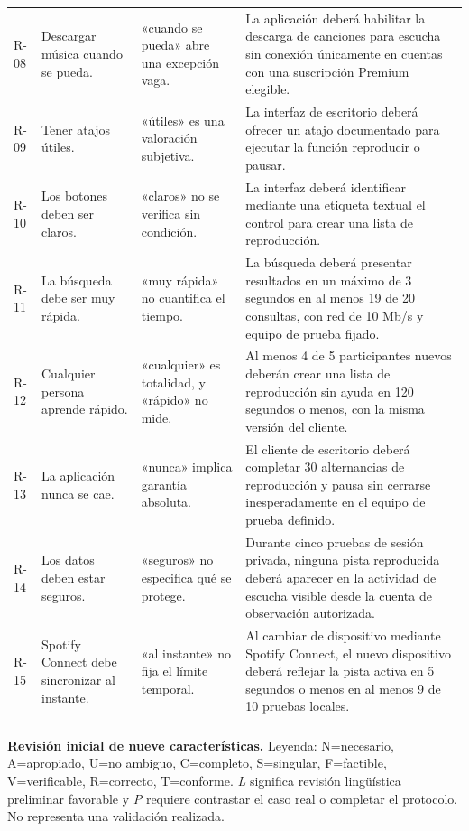 \begin{longtable}{@{}p{.06\linewidth}p{.185\linewidth}p{.19\linewidth}p{.51\linewidth}@{}}
R-08 & Descargar música cuando se pueda. & «cuando se pueda» abre una excepción vaga. & La aplicación deberá habilitar la descarga de canciones para escucha sin conexión únicamente en cuentas con una suscripción Premium elegible.\\\addlinespace[0pt]
R-09 & Tener atajos útiles. & «útiles» es una valoración subjetiva. & La interfaz de escritorio deberá ofrecer un atajo documentado para ejecutar la función reproducir o pausar.\\\addlinespace[0pt]
R-10 & Los botones deben ser claros. & «claros» no se verifica sin condición. & La interfaz deberá identificar mediante una etiqueta textual el control para crear una lista de reproducción.\\\addlinespace[0pt]
R-11 & La búsqueda debe ser muy rápida. & «muy rápida» no cuantifica el tiempo. & La búsqueda deberá presentar resultados en un máximo de 3 segundos en al menos 19 de 20 consultas, con red de 10 Mb/s y equipo de prueba fijado.\\\addlinespace[0pt]
R-12 & Cualquier persona aprende rápido. & «cualquier» es totalidad, y «rápido» no mide. & Al menos 4 de 5 participantes nuevos deberán crear una lista de reproducción sin ayuda en 120 segundos o menos, con la misma versión del cliente.\\\addlinespace[0pt]
R-13 & La aplicación nunca se cae. & «nunca» implica garantía absoluta. & El cliente de escritorio deberá completar 30 alternancias de reproducción y pausa sin cerrarse inesperadamente en el equipo de prueba definido.\\\addlinespace[0pt]
R-14 & Los datos deben estar seguros. & «seguros» no especifica qué se protege. & Durante cinco pruebas de sesión privada, ninguna pista reproducida deberá aparecer en la actividad de escucha visible desde la cuenta de observación autorizada.\\\addlinespace[0pt]
R-15 & Spotify Connect debe sincronizar al instante. & «al instante» no fija el límite temporal. & Al cambiar de dispositivo mediante Spotify Connect, el nuevo dispositivo deberá reflejar la pista activa en 5 segundos o menos en al menos 9 de 10 pruebas locales.\\\addlinespace[0pt]
\bottomrule\end{longtable}\endgroup
\textbf{Revisión inicial de nueve características.} Leyenda: N=necesario, A=apropiado, U=no ambiguo, C=completo, S=singular, F=factible, V=verificable, R=correcto, T=conforme. \emph{L} significa revisión lingüística preliminar favorable y \emph{P} requiere contrastar el caso real o completar el protocolo. No representa una validación realizada.
